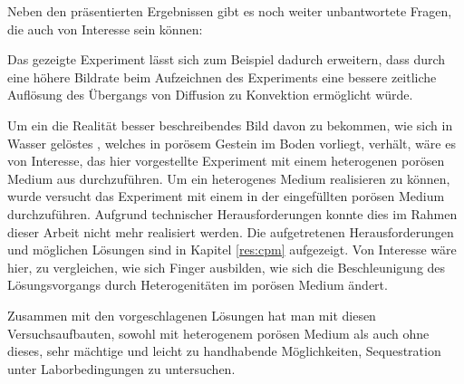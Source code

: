 
Neben den präsentierten Ergebnissen gibt es noch weiter unbantwortete Fragen, die auch von Interesse sein können:


Das gezeigte Experiment lässt sich zum Beispiel dadurch erweitern, dass durch eine höhere Bildrate beim Aufzeichnen des Experiments eine bessere zeitliche Auflösung des Übergangs von Diffusion zu Konvektion ermöglicht würde. 


Um ein die Realität besser beschreibendes Bild davon zu bekommen, wie sich in Wasser gelöstes \COTn, welches in porösem Gestein im Boden vorliegt, verhält, wäre es von Interesse, das hier vorgestellte \COTm Experiment mit einem heterogenen porösen Medium aus \BOG durchzuführen. 
Um ein heterogenes Medium realisieren zu können, wurde versucht das Experiment mit einem in der \HSC eingefüllten porösen Medium durchzuführen. Aufgrund technischer Herausforderungen konnte dies im Rahmen dieser Arbeit nicht mehr realisiert werden. Die aufgetretenen Herausforderungen und möglichen Lösungen sind in Kapitel \ref{res:cpm} aufgezeigt.
Von Interesse wäre hier, zu vergleichen, wie sich Finger ausbilden, \dah wie sich die Beschleunigung des Lösungsvorgangs durch Heterogenitäten im porösen Medium ändert.

Zusammen mit den vorgeschlagenen Lösungen hat man mit diesen Versuchsaufbauten, sowohl mit heterogenem porösen Medium als auch ohne dieses, sehr mächtige und leicht zu handhabende Möglichkeiten, \COTm Sequestration unter Laborbedingungen zu untersuchen.